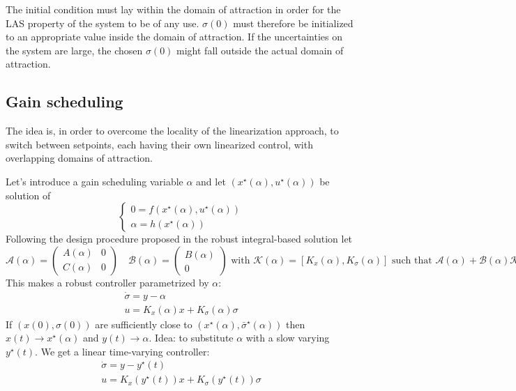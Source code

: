 \documentclass[english]{lectures}
\begin{document}
The initial condition must lay within the domain of attraction in order for the LAS property of the system to be of any use. $\sigma(0)$ must therefore be initialized to an appropriate value inside the domain of attraction. If the uncertainties on the system are large, the chosen $\sigma(0)$ might fall outside the actual domain of attraction.

\subsection{Gain scheduling}
The idea is, in order to overcome the locality of the linearization approach, to switch between setpoints, each having their own linearized control, with overlapping domains of attraction.

Let's introduce a gain scheduling variable $\alpha$ and let $(x^\star(\alpha),u^\star(\alpha))$ be solution of\[
    \left\{ \begin{array}{l}
        0=f(x^\star(\alpha),u^\star(\alpha))\\[1ex]
        {}\alpha=h(x^\star(\alpha))
        \end{array} \right.
    \]
Following the design procedure proposed in the robust integral-based solution let
\[
    \mathcal{A}(\alpha)=\begin{pmatrix}
        A(\alpha) & 0 \\
        C(\alpha) & 0
    \end{pmatrix} \quad \mathcal{B}(\alpha)=\begin{pmatrix}
        B(\alpha) \\ 0
    \end{pmatrix} \text{ with } \mathcal{K}(\alpha)=[K_x(\alpha),K_\sigma(\alpha)] \text{ such that } \mathcal{A}(\alpha)+\mathcal{B}(\alpha)\mathcal{K}(\alpha) \text { is Hurwitz}
\]
This makes a robust controller parametrized by $\alpha$:
\begin{gather*}
    \dot{\sigma}=y-\alpha\\
    u=K_x(\alpha)x+K_\sigma(\alpha)\sigma
\end{gather*}
If $(x(0),\sigma(0))$ are sufficiently close to $(x^\star(\alpha),\bar{\sigma}^\star(\alpha))$ then $x(t)\to x^\star(\alpha)$ and $y(t) \to \alpha$. Idea: to substitute $\alpha$ with a slow varying $y^\star(t)$. We get a linear time-varying controller:
\begin{gather*}
    \dot{\sigma}=y-y^\star(t)\\
    u=K_x(y^\star(t))x+K_\sigma(y^\star(t))\sigma
\end{gather*}
\end{document}
